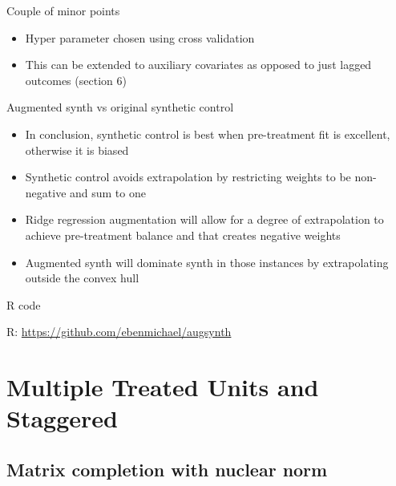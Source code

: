 \documentclass{beamer}
\begin{document}


\begin{frame}{Couple of minor points}

\begin{itemize}
\item Hyper parameter chosen using cross validation
\item This can be extended to auxiliary covariates as opposed to just lagged outcomes (section 6)
\end{itemize}

\end{frame}





\begin{frame}{Augmented synth vs original synthetic control}

\begin{itemize}
\item In conclusion, synthetic control is best when pre-treatment fit is excellent, otherwise it is biased
\item Synthetic control avoids extrapolation by restricting weights to be non-negative and sum to one
\item Ridge regression augmentation will allow for a degree of extrapolation to achieve pre-treatment balance and that creates negative weights
\item Augmented synth will dominate synth in those instances by extrapolating outside the convex hull
\end{itemize}

\end{frame}



\begin{frame}{R code}

R: \url{https://github.com/ebenmichael/augsynth}

\end{frame}


\section{Multiple Treated Units and Staggered}

\subsection{Matrix completion with nuclear norm}
\end{document}
